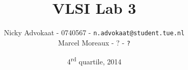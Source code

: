 \documentclass[a4paper,twoside,11pt]{article}
\title{\vspace{-\baselineskip}\sffamily\bfseries VLSI Lab 3}
\author{
Nicky Advokaat - 0740567 - {\tt n.advokaat@student.tue.nl} \\
Marcel  Moreaux - ? - {\tt ?}\\
}
\date{4\textsuperscript{rd} quartile, 2014}
\numberwithin{equation}{section}
\begin{document}
\maketitle
\thispagestyle{empty}
\begin{abstract}

\end{abstract}


\end{document}
